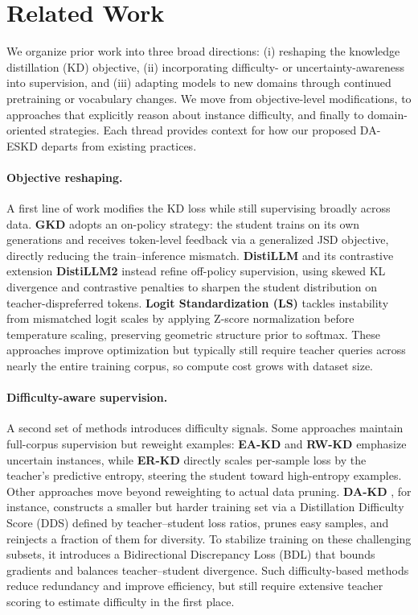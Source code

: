 \section{Related Work}

We organize prior work into three broad directions: (i) reshaping the knowledge distillation (KD) objective, (ii) incorporating difficulty- or uncertainty-awareness into supervision, and (iii) adapting models to new domains through continued pretraining or vocabulary changes. We move from objective-level modifications, to approaches that explicitly reason about instance difficulty, and finally to domain-oriented strategies. Each thread provides context for how our proposed DA-ESKD departs from existing practices.

\paragraph{Objective reshaping.}
A first line of work modifies the KD loss while still supervising broadly across data. \textbf{GKD} \cite{gkd} adopts an on-policy strategy: the student trains on its own generations and receives token-level feedback via a generalized JSD objective, directly reducing the train–inference mismatch. \textbf{DistiLLM} \cite{distillm} and its contrastive extension \textbf{DistiLLM2} \cite{ko2025distillm} instead refine off-policy supervision, using skewed KL divergence and contrastive penalties to sharpen the student distribution on teacher-dispreferred tokens. \textbf{Logit Standardization (LS)} \cite{ls} tackles instability from mismatched logit scales by applying Z-score normalization before temperature scaling, preserving geometric structure prior to softmax. These approaches improve optimization but typically still require teacher queries across nearly the entire training corpus, so compute cost grows with dataset size.

\paragraph{Difficulty-aware supervision.}
A second set of methods introduces difficulty signals. Some approaches maintain full-corpus supervision but reweight examples: \textbf{EA-KD} \cite{eakd} and \textbf{RW-KD} \cite{rwkd} emphasize uncertain instances, while \textbf{ER-KD} \cite{erkd} directly scales per-sample loss by the teacher’s predictive entropy, steering the student toward high-entropy examples. Other approaches move beyond reweighting to actual data pruning. \textbf{DA-KD} \cite{dakd}, for instance, constructs a smaller but harder training set via a Distillation Difficulty Score (DDS) defined by teacher–student loss ratios, prunes easy samples, and reinjects a fraction of them for diversity. To stabilize training on these challenging subsets, it introduces a Bidirectional Discrepancy Loss (BDL) that bounds gradients and balances teacher–student divergence. Such difficulty-based methods reduce redundancy and improve efficiency, but still require extensive teacher scoring to estimate difficulty in the first place.

